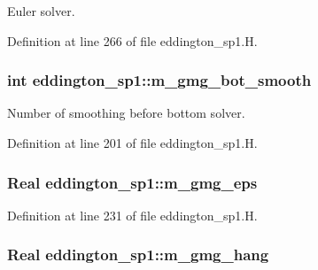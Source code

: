 Euler solver. 



Definition at line 266 of file eddington\+\_\+sp1.\+H.

\subsubsection[{\texorpdfstring{m\+\_\+gmg\+\_\+bot\+\_\+smooth}{m_gmg_bot_smooth}}]{\setlength{\rightskip}{0pt plus 5cm}int eddington\+\_\+sp1\+::m\+\_\+gmg\+\_\+bot\+\_\+smooth\hspace{0.3cm}{\ttfamily [protected]}}\hypertarget{classeddington__sp1_a9d0b456a8cdada8636f8087f947528fe}{}\label{classeddington__sp1_a9d0b456a8cdada8636f8087f947528fe}


Number of smoothing before bottom solver. 



Definition at line 201 of file eddington\+\_\+sp1.\+H.

\subsubsection[{\texorpdfstring{m\+\_\+gmg\+\_\+eps}{m_gmg_eps}}]{\setlength{\rightskip}{0pt plus 5cm}Real eddington\+\_\+sp1\+::m\+\_\+gmg\+\_\+eps\hspace{0.3cm}{\ttfamily [protected]}}\hypertarget{classeddington__sp1_af5293cfeac66bcbef820da5d1afe2df1}{}\label{classeddington__sp1_af5293cfeac66bcbef820da5d1afe2df1}


Definition at line 231 of file eddington\+\_\+sp1.\+H.

\subsubsection[{\texorpdfstring{m\+\_\+gmg\+\_\+hang}{m_gmg_hang}}]{\setlength{\rightskip}{0pt plus 5cm}Real eddington\+\_\+sp1\+::m\+\_\+gmg\+\_\+hang\hspace{0.3cm}{\ttfamily [protected]}}\hypertarget{classeddington__sp1_ae54481747a438bd1ce4678c404a22681}{}\label{classeddington__sp1_ae54481747a438bd1ce4678c404a22681}


